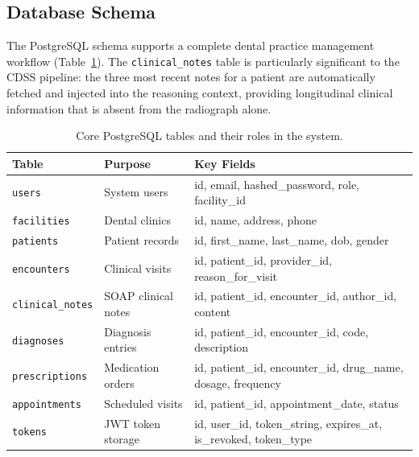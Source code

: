 \documentclass[12pt,a4paper]{report}
\begin{document}
	
	
	\subsection*{Database Schema}
	
	The PostgreSQL schema supports a complete dental practice management workflow
	(Table~\ref{tab:db_schema}). The \texttt{clinical\_notes} table is particularly significant
	to the CDSS pipeline: the three most recent notes for a patient are automatically fetched
	and injected into the reasoning context, providing longitudinal clinical information that
	is absent from the radiograph alone.
	
	\begin{table}[H]
		\centering
		\caption{Core PostgreSQL tables and their roles in the system.}
		\label{tab:db_schema}
		{\small
			\begin{tabular}{p{3.5cm}p{3.2cm}p{5.5cm}}
				\toprule
				\textbf{Table} & \textbf{Purpose} & \textbf{Key Fields} \\
				\midrule
				\texttt{users}           & System users             & id, email, hashed\_password, role, facility\_id \\
				\texttt{facilities}      & Dental clinics           & id, name, address, phone \\
				\texttt{patients}        & Patient records          & id, first\_name, last\_name, dob, gender \\
				\texttt{encounters}      & Clinical visits          & id, patient\_id, provider\_id, reason\_for\_visit \\
				\texttt{clinical\_notes} & SOAP clinical notes      & id, patient\_id, encounter\_id, author\_id, content \\
				\texttt{diagnoses}       & Diagnosis entries        & id, patient\_id, encounter\_id, code, description \\
				\texttt{prescriptions}   & Medication orders   &id, patient\_id, encounter\_id, drug\_name, dosage, frequency \\
				\texttt{appointments}    & Scheduled visits         & id, patient\_id, appointment\_date, status \\
				\texttt{tokens}          & JWT token storage        & id, user\_id, token\_string, expires\_at, is\_revoked, token\_type \\
				\bottomrule
			\end{tabular}
		}
	\end{table}
	
\end{document}
